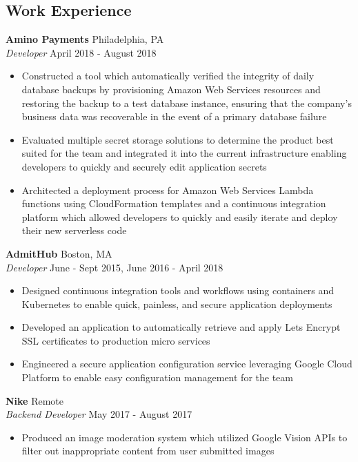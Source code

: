 \documentclass[10pt]{article}
\begin{document}
\begin{flushleft}
\section{Work Experience}
	\textbf{Amino Payments} \hfill Philadelphia, PA \\
	\textit{Developer} \hfill April 2018 - August 2018 \\
	\begin{itemize}
		\item Constructed a tool which automatically verified the integrity of daily database backups by provisioning
			Amazon Web Services resources and restoring the backup to a test database instance, ensuring that the 
			company's business data was recoverable in the event of a primary database failure

		\item Evaluated multiple secret storage solutions to determine the product best suited for the team and
			integrated it into the current infrastructure enabling developers to quickly and securely edit 
			application secrets

		\item Architected a deployment process for Amazon Web Services Lambda functions using CloudFormation templates
			and a continuous integration platform which allowed developers to quickly and easily iterate and deploy 
			their new serverless code
	\end{itemize}


	\vspace{0.5em}
	\textbf{AdmitHub} \hfill Boston, MA \\
	\textit{Developer} \hfill June - Sept 2015, June 2016 - April 2018 \\
	\begin{itemize}
		\item Designed continuous integration tools and workflows using containers and Kubernetes to enable quick, 
			painless, and secure application deployments

		\item Developed an application to automatically retrieve and apply Lets Encrypt SSL certificates to production 
			micro services

		\item Engineered a secure application configuration service leveraging Google Cloud Platform to enable easy 
		      configuration management for the team
	\end{itemize}

	\vspace{0.5em}
	\textbf{Nike} \hfill Remote \\
	\textit{Backend Developer} \hfill May 2017 - August 2017 \\
	\begin{itemize}
		\item Produced an image moderation system which utilized Google Vision APIs to filter out inappropriate content 
		    from user submitted images


\end{itemize}
\end{flushleft}
\end{document}

